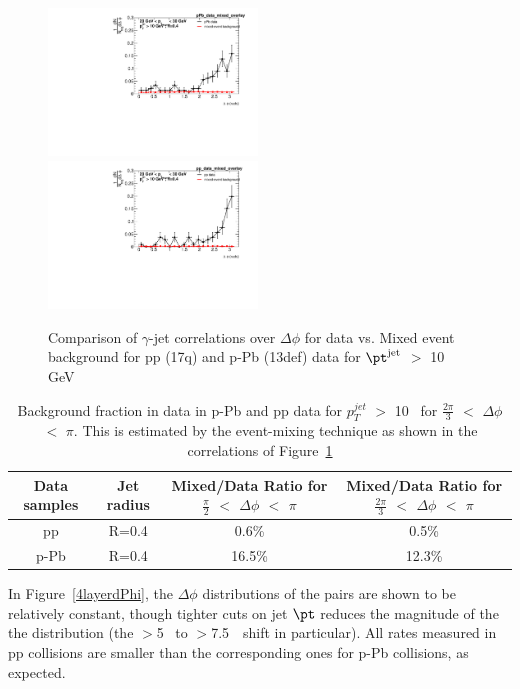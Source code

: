 \begin{figure}[h]
\centering
\includegraphics[width=0.495\textwidth]{GammaJet/sig_dPhipPb_data_mixed_overlay_Comparison.pdf}
\includegraphics[width=0.495\textwidth]{GammaJet/sig_dPhipp_data_mixed_overlay_Comparison.pdf}
\caption{Comparison of $\gamma$-jet correlations over $\Delta \phi$ for data vs. Mixed event background for pp (17q) and p-Pb (13def) data for $\pt^{\mathrm{jet}}$ $>$ 10 GeV}
\label{fig:data_mixed_event_comparison}
\end{figure}

\begin{table}[h]
\caption{Background fraction in data in p-Pb and pp data for $p_{T}^{jet}$ $>$ 10 \GeVc~for $\frac{2 \pi}{3}$ $<$ $\Delta \phi$ $<$ $\pi$. This is estimated by the event-mixing technique as shown in the correlations of Figure~\ref{fig:data_mixed_event_comparison}}
\centering
\begin{tabular}{c c c c}
\hline
Data samples & Jet radius & Mixed/Data Ratio for $\frac{\pi}{2}$ $<$ $\Delta \phi$ $<$ $\pi$ & Mixed/Data Ratio for $\frac{2 \pi}{3}$ $<$ $\Delta \phi$ $<$ $\pi$ \\
\hline
pp & R=0.4&  0.6\% & 0.5\% \\
p-Pb & R=0.4& 16.5\% & 12.3\% \\
[1ex]
\hline
\end{tabular}
\label{tab:MixedEventBackgroundRatios}
\end{table}

In Figure~\ref{4layerdPhi}, the $\Delta \phi$ distributions of the pairs are shown to be relatively constant, though tighter cuts on jet $\pt$ reduces the magnitude of the the distribution (the $>$5 \GeVc~to $>$7.5~\GeVc~shift in particular). All rates measured in pp collisions are smaller than the corresponding ones for p-Pb collisions, as expected. 

